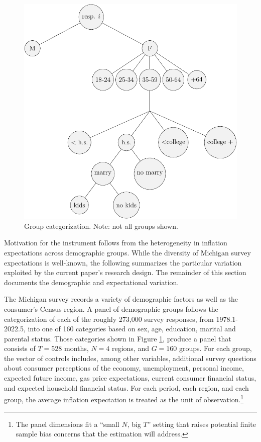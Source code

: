 \documentclass[12pt]{article}
\begin{document}
\begin{figure}
\centering
\caption{Group categorization. Note: not all groups shown.}\label{fig:GroupTree}
\includegraphics[height = \textwidth, width = \textwidth]{figs/GroupCat}
\end{figure}

Motivation for the instrument follows from the heterogeneity in inflation expectations across demographic groups.  While the diversity of Michigan survey expectations is well-known, the following summarizes the particular variation exploited by the current paper's research design.  The remainder of this section documents the demographic and expectational variation.

The Michigan survey records a variety of demographic factors as well as the consumer's Census region. A panel of demographic groups follows the categorization of each of the roughly 273,000 survey responses, from 1978.1-2022.5, into one of 160 categories based on sex, age, education, marital and parental status. Those categories shown in Figure \ref{fig:GroupTree}, produce a panel that consists of $T = 528$ months, $N = 4$ regions, and $G=160$ groups. For each group, the vector of controls includes, among other variables, additional survey questions about consumer perceptions of the economy, unemployment, personal income, expected future income, gas price expectations, current consumer financial status, and expected household financial status. For each period, each region, and each group, the average inflation expectation is treated as the unit of observation.\footnote{The panel dimensions fit a ``small $N$, big $T$'' setting that raises potential finite sample bias concerns that the estimation will address.}
\end{document}
